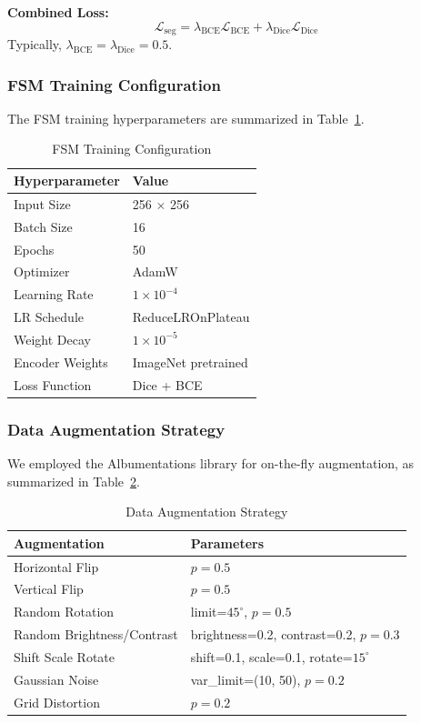 \documentclass[conference]{IEEEtran}
\begin{document}
\textbf{Combined Loss:}
\begin{equation}
    \mathcal{L}_{\text{seg}} = \lambda_{\text{BCE}} \mathcal{L}_{\text{BCE}} + \lambda_{\text{Dice}} \mathcal{L}_{\text{Dice}}
\end{equation}
Typically, $\lambda_{\text{BCE}} = \lambda_{\text{Dice}} = 0.5$.

\subsubsection{FSM Training Configuration}
The FSM training hyperparameters are summarized in Table~\ref{tab:fsm_config}.

\begin{table}[htbp]
\caption{FSM Training Configuration}
\label{tab:fsm_config}
\centering
\begin{tabular}{ll}
\toprule
\textbf{Hyperparameter} & \textbf{Value} \\
\midrule
Input Size & 256 $\times$ 256 \\
Batch Size & 16 \\
Epochs & 50 \\
Optimizer & AdamW \\
Learning Rate & $1 \times 10^{-4}$ \\
LR Schedule & ReduceLROnPlateau \\
Weight Decay & $1 \times 10^{-5}$ \\
Encoder Weights & ImageNet pretrained \\
Loss Function & Dice + BCE \\
\bottomrule
\end{tabular}
\end{table}

\subsubsection{Data Augmentation Strategy}
We employed the Albumentations library for on-the-fly augmentation, as summarized in Table~\ref{tab:augmentation}.

\begin{table}[htbp]
\caption{Data Augmentation Strategy}
\label{tab:augmentation}
\centering
\begin{tabular}{ll}
\toprule
\textbf{Augmentation} & \textbf{Parameters} \\
\midrule
Horizontal Flip & $p=0.5$ \\
Vertical Flip & $p=0.5$ \\
Random Rotation & limit=$45^{\circ}$, $p=0.5$ \\
Random Brightness/Contrast & brightness=0.2, contrast=0.2, $p=0.3$ \\
Shift Scale Rotate & shift=0.1, scale=0.1, rotate=$15^{\circ}$ \\
Gaussian Noise & var\_limit=(10, 50), $p=0.2$ \\
Grid Distortion & $p=0.2$ \\
\bottomrule
\end{tabular}
\end{table}
\end{document}
